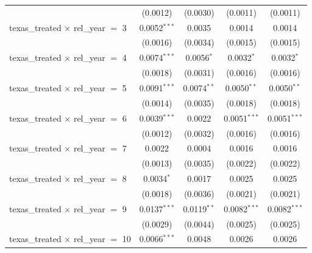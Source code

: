 \begin{tabular}{lcccc}
                                                & (0.0012)        & (0.0030)            & (0.0011)               & (0.0011)\\   
   texas\_treated $\times$ rel\_year $=$ 3      & 0.0052$^{***}$  & 0.0035              & 0.0014                 & 0.0014\\   
                                                & (0.0016)        & (0.0034)            & (0.0015)               & (0.0015)\\   
   texas\_treated $\times$ rel\_year $=$ 4      & 0.0074$^{***}$  & 0.0056$^{*}$        & 0.0032$^{*}$           & 0.0032$^{*}$\\   
                                                & (0.0018)        & (0.0031)            & (0.0016)               & (0.0016)\\   
   texas\_treated $\times$ rel\_year $=$ 5      & 0.0091$^{***}$  & 0.0074$^{**}$       & 0.0050$^{**}$          & 0.0050$^{**}$\\   
                                                & (0.0014)        & (0.0035)            & (0.0018)               & (0.0018)\\   
   texas\_treated $\times$ rel\_year $=$ 6      & 0.0039$^{***}$  & 0.0022              & 0.0051$^{***}$         & 0.0051$^{***}$\\   
                                                & (0.0012)        & (0.0032)            & (0.0016)               & (0.0016)\\   
   texas\_treated $\times$ rel\_year $=$ 7      & 0.0022          & 0.0004              & 0.0016                 & 0.0016\\   
                                                & (0.0013)        & (0.0035)            & (0.0022)               & (0.0022)\\   
   texas\_treated $\times$ rel\_year $=$ 8      & 0.0034$^{*}$    & 0.0017              & 0.0025                 & 0.0025\\   
                                                & (0.0018)        & (0.0036)            & (0.0021)               & (0.0021)\\   
   texas\_treated $\times$ rel\_year $=$ 9      & 0.0137$^{***}$  & 0.0119$^{**}$       & 0.0082$^{***}$         & 0.0082$^{***}$\\   
                                                & (0.0029)        & (0.0044)            & (0.0025)               & (0.0025)\\   
   texas\_treated $\times$ rel\_year $=$ 10     & 0.0066$^{***}$  & 0.0048              & 0.0026                 & 0.0026\\   

\end{tabular}
